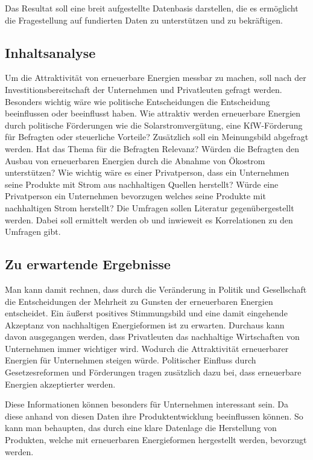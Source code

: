 \documentclass[12pt,a4paper]{article}
\begin{document}
Das Resultat soll eine breit aufgestellte Datenbasis darstellen, 
die es ermöglicht die Fragestellung auf fundierten Daten zu unterstützen und zu bekräftigen.  

\subsection*{Inhaltsanalyse}
Um die Attraktivität von erneuerbare Energien messbar zu machen, 
soll nach der Investitionsbereitschaft der Unternehmen und Privatleuten 
gefragt werden. Besonders wichtig wäre wie politische Entscheidungen die 
Entscheidung beeinflussen oder beeinflusst haben. Wie attraktiv werden erneuerbare 
Energien durch politische Förderungen wie die Solarstromvergütung, eine KfW-Förderung 
für Befragten oder steuerliche Vorteile? 
Zusätzlich soll ein Meinungsbild abgefragt werden. 
Hat das Thema für die Befragten Relevanz? Würden die Befragten den 
Ausbau von erneuerbaren Energien durch die Abnahme von Ökostrom unterstützen? 
Wie wichtig wäre es einer Privatperson, dass ein Unternehmen seine Produkte mit Strom 
aus nachhaltigen Quellen herstellt? Würde eine Privatperson ein Unternehmen bevorzugen 
welches seine Produkte mit nachhaltigen Strom herstellt? Die Umfragen sollen Literatur 
gegenübergestellt werden. Dabei soll ermittelt werden ob und inwieweit es Korrelationen 
zu den Umfragen gibt. 

\subsection*{Zu erwartende Ergebnisse}
Man kann damit rechnen, dass durch die Veränderung in Politik und Gesellschaft 
die Entscheidungen der Mehrheit zu Gunsten der erneuerbaren Energien entscheidet.
Ein äußerst positives Stimmungsbild und eine damit 
eingehende Akzeptanz von nachhaltigen Energieformen ist zu erwarten. Durchaus kann
davon ausgegangen werden, dass Privatleuten das nachhaltige Wirtschaften von Unternehmen
immer wichtiger wird. Wodurch die Attraktivität erneuerbarer Energien für Unternehmen steigen 
würde. Politischer Einfluss durch Gesetzesreformen und Förderungen tragen zusätzlich 
dazu bei, dass erneuerbare Energien akzeptierter werden.

Diese Informationen können besonders für Unternehmen interessant sein.
Da diese anhand von diesen Daten ihre Produktentwicklung beeinflussen können.
So kann man behaupten, das durch eine klare Datenlage die Herstellung von Produkten,
welche mit erneuerbaren Energieformen hergestellt werden, bevorzugt werden.



\nocite{*}
\printbibliography
\end{document}
